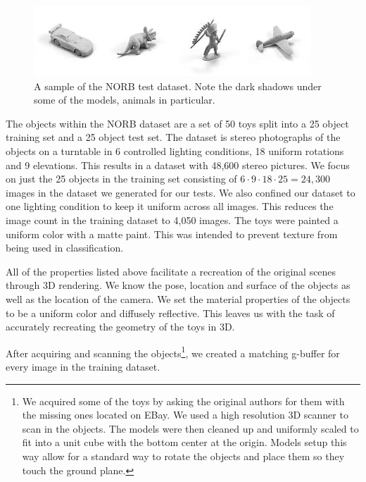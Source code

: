 \documentclass[10pt,twocolumn,letterpaper]{article}
\begin{document}
\begin{figure}[h!]
\centering
\includegraphics[width=1.0\columnwidth]{./assets/NORBTestSmall.png}
\caption{A sample of the NORB test dataset. Note the dark shadows under some of the models, animals in particular.}
\label{fig:norb-samples}
\end{figure}

The objects within the NORB dataset are a set of 50 toys split into a 25 object training set and a 25 object test set. The dataset is stereo photographs of the objects on a turntable in 6 controlled lighting conditions, 18 uniform rotations and 9 elevations. This results in a dataset with 48,600 stereo pictures.  We focus on just the 25 objects in the training set consisting of $6\cdot9\cdot18\cdot25=24,300$ images in the dataset we generated for our tests.  We also confined our dataset to one lighting condition to keep it uniform across all images.  This reduces the image count in the training dataset to 4,050 images.   The toys were painted a uniform color with a matte paint. This was intended to prevent texture from being used in classification.

 All of the properties listed above facilitate a recreation of the original scenes through 3D rendering. We know the pose, location and surface of the objects as well as the location of the camera. We set the material properties of the objects to be a uniform color and diffusely reflective. This leaves us with the task of accurately recreating the geometry of the toys in 3D.
 
 After acquiring and scanning the objects\footnote{We acquired some of the toys by asking the original authors for them with the missing ones located on EBay. %
We used a high resolution 3D scanner to scan in the objects.  %
The models were then cleaned up and uniformly scaled to fit into a unit cube with the bottom center at the origin.  Models setup this way allow for a standard way to rotate the objects and place them so they touch the ground plane.}, we created a matching g-buffer for every image in the training dataset.  
\end{document}

